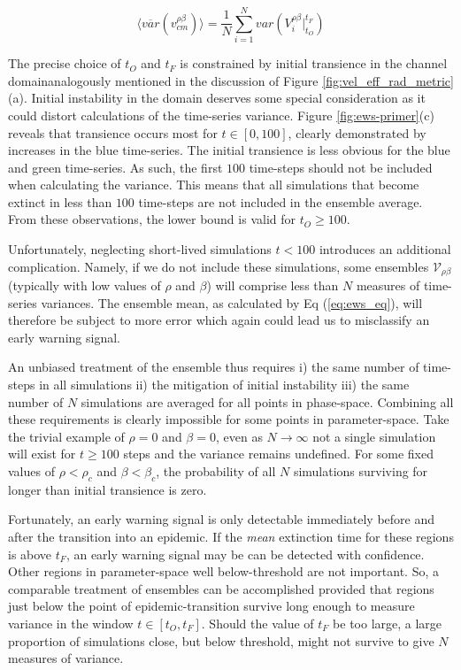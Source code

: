 \begin{equation}
\label{eq:ews_eq1}
    \big\langle \overline{var}(v^{\rho\beta}_{cm}) \big\rangle = \frac{1}{N}\sum\limits_{i=1}^{N} var(V_i^{\rho\beta}\Big|^{t_F}_{t_O})
\end{equation}

The precise choice of $t_O$ and $t_F$ is constrained by initial transience in the channel %
domain\textemdash analogously mentioned in the discussion of Figure \ref{fig:vel_eff_rad_metric}(a). %
Initial instability in the domain deserves some special consideration as it could distort %
calculations of the time-series variance. %
Figure \ref{fig:ews-primer}(c) reveals that transience occurs most for $t\in[0, 100]$, %
clearly demonstrated by increases in the blue time-series. %
The initial transience is less obvious for the blue and green time-series. %
As such, the first $100$ time-steps should not be included when calculating the variance. %
This means that all simulations that become extinct in less than $100$ time-steps are not %
included in the ensemble average. From these observations, the lower bound is valid for $t_O \geq 100$.%

Unfortunately, neglecting short-lived simulations $t<100$ introduces an additional complication. %
Namely, if we do not include these simulations, some ensembles $\mathcal{V}_{\rho\beta}$ %
(typically with low values of $\rho$ and $\beta$) will comprise less than $N$ measures of %
time-series variances. The ensemble mean, as calculated by Eq (\ref{eq:ews_eq}), will therefore %
be subject to more error which again could lead us to misclassify an early warning signal. %

An unbiased treatment of the ensemble thus requires i) the same number of time-steps in all %
simulations ii) the mitigation of initial instability iii) the same number of $N$ simulations %
are averaged for all points in phase-space. Combining all these requirements is clearly impossible %
for some points in parameter-space. Take the trivial example of $\rho=0$ and $\beta=0$, even %
as $N\rightarrow\infty$ not a single simulation will exist for $t\geq100$ steps and the %
variance remains undefined. For some fixed values of $\rho < \rho_c$ and $\beta<\beta_c$, %
the probability of all $N$ simulations surviving for longer than initial transience is zero. %

Fortunately, an early warning signal is only detectable immediately before and after the %
transition into an epidemic. If the \textit{mean} extinction time for these regions is %
above $t_F$, an early warning signal may be can be detected with confidence. %
Other regions in parameter-space well below-threshold are not important. %
So, a comparable treatment of ensembles can be accomplished provided that regions just %
below the point of epidemic-transition survive long enough to measure variance in the %
window $t \in [t_O, t_F]$. Should the value of $t_F$ be too large, a large proportion of %
simulations close, but below threshold, might not survive to give $N$ measures of variance. %

